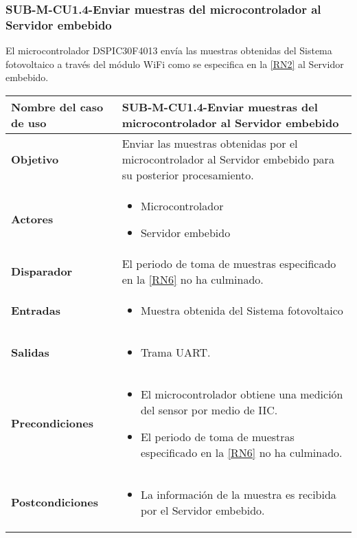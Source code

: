 \subsubsection{SUB-M-CU1.4-Enviar muestras del microcontrolador al Servidor embebido}\label{SUB-M-CU1.4}
El microcontrolador DSPIC30F4013 envía las muestras obtenidas del Sistema fotovoltaico a través del módulo WiFi como se especifica en la \ref{RN2} al Servidor embebido.
\begin{longtable}{|J{5cm}|J{10.3cm}|}
	\hline
	\textbf{Nombre del caso de uso} &
		SUB-M-CU1.4-Enviar muestras del microcontrolador al Servidor embebido \\ \hline
	\textbf{Objetivo} &
		Enviar las muestras obtenidas por el microcontrolador al Servidor embebido para su posterior procesamiento. \\ \hline
	\textbf{Actores} &
	    \begin{itemize}
		    \item Microcontrolador
		    \item Servidor embebido
		\end{itemize}\\ \hline 
	\textbf{Disparador} & 
		El periodo de toma de muestras especificado en la \ref{RN6} no ha culminado.\\ \hline 
	\textbf{Entradas} & %
		\begin{itemize}
				\item Muestra obtenida del Sistema fotovoltaico
		\end{itemize}
		\\ \hline 
	\textbf{Salidas} & 
	    \begin{itemize}
	        \item Trama UART.
	    \end{itemize}\\ \hline
	\textbf{Precondiciones} & 
		\begin{itemize}
		    \item El microcontrolador obtiene una medición del sensor por medio de IIC.
		    \item El periodo de toma de muestras especificado en la \ref{RN6} no ha culminado.
		\end{itemize}\\ \hline
	\textbf{Postcondiciones} &
		\begin{itemize}
			\item La información de la muestra es recibida por el Servidor embebido.

\end{itemize}
\end{longtable}
